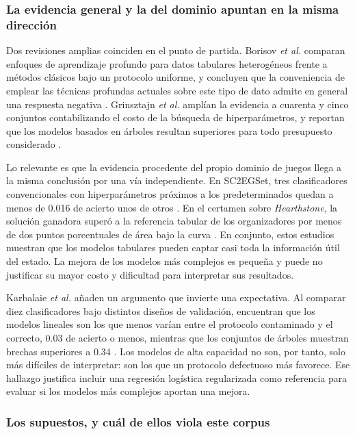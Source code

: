\subsubsection{La evidencia general y la del dominio apuntan en la misma
dirección}

Dos revisiones amplias coinciden en el punto de partida. Borisov \textit{et
al.} comparan enfoques de aprendizaje profundo para datos tabulares
heterogéneos frente a métodos clásicos bajo un protocolo uniforme, y
concluyen que la conveniencia de emplear las técnicas profundas actuales
sobre este tipo de dato admite en general una respuesta negativa
\cite{borisov_tabular_2024}. Grinsztajn \textit{et al.} amplían la evidencia
a cuarenta y cinco conjuntos contabilizando el costo de la búsqueda de
hiperparámetros, y reportan que los modelos basados en árboles resultan
superiores para todo presupuesto considerado \cite{grinsztajn_trees_2022}.

Lo relevante es que la evidencia procedente del propio dominio de juegos
llega a la misma conclusión por una vía independiente. En SC2EGSet, tres
clasificadores convencionales con hiperparámetros próximos a los
predeterminados quedan a menos de 0.016 de acierto unos de otros
\cite{bialecki_sc2egset_2023}. En el certamen sobre \emph{Hearthstone}, la
solución ganadora superó a la referencia tabular de los organizadores por
menos de dos puntos porcentuales de área bajo la curva
\cite{janusz_hearthstone_2017}. En conjunto, estos estudios muestran que
los modelos tabulares pueden captar casi toda la información útil del
estado. La mejora de los modelos más complejos es pequeña y puede no
justificar su mayor costo y dificultad para interpretar sus resultados.

Karbalaie \textit{et al.} añaden un argumento que invierte una expectativa.
Al comparar diez clasificadores bajo distintos diseños de validación,
encuentran que los modelos lineales son los que menos varían entre el
protocolo contaminado y el correcto, 0.03 de acierto o menos, mientras
que los conjuntos de árboles muestran brechas superiores a 0.34
\cite{karbalaie_participantaware_2026}. Los modelos de alta capacidad no
son, por tanto, solo más difíciles de interpretar: son los que un protocolo
defectuoso más favorece. Ese hallazgo justifica incluir una regresión
logística regularizada como referencia para evaluar si los modelos más
complejos aportan una mejora.

\subsubsection{Los supuestos, y cuál de ellos viola este corpus}

